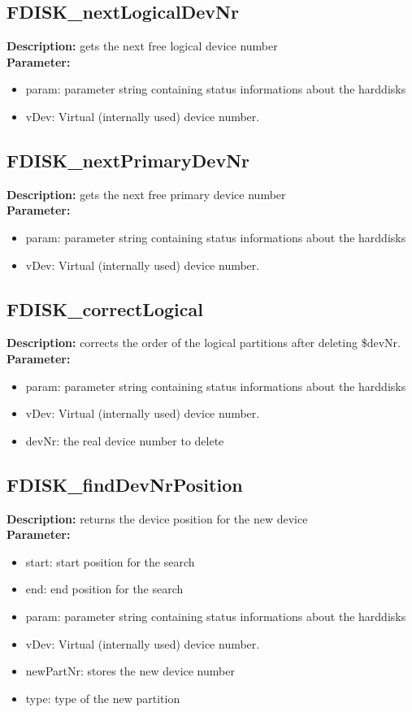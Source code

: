 \subsection{FDISK\_nextLogicalDevNr}
\textbf{Description:} gets the next free logical device number\\
\textbf{Parameter:}
\begin{itemize}
\item param: parameter string containing status informations about the harddisks
\item vDev: Virtual (internally used) device number.
\end{itemize}

\subsection{FDISK\_nextPrimaryDevNr}
\textbf{Description:} gets the next free primary device number\\
\textbf{Parameter:}
\begin{itemize}
\item param: parameter string containing status informations about the harddisks
\item vDev: Virtual (internally used) device number.
\end{itemize}

\subsection{FDISK\_correctLogical}
\textbf{Description:} corrects the order of the logical partitions after deleting \$devNr.\\
\textbf{Parameter:}
\begin{itemize}
\item param: parameter string containing status informations about the harddisks
\item vDev: Virtual (internally used) device number.
\item devNr: the real device number to delete
\end{itemize}

\subsection{FDISK\_findDevNrPosition}
\textbf{Description:} returns the device position for the new device\\
\textbf{Parameter:}
\begin{itemize}
\item start: start position for the search
\item end: end position for the search
\item param: parameter string containing status informations about the harddisks
\item vDev: Virtual (internally used) device number.
\item newPartNr: stores the new device number
\item type: type of the new partition
\end{itemize}

